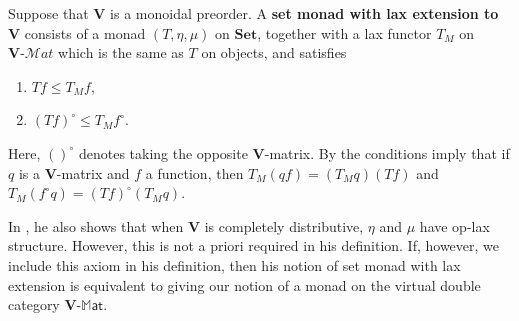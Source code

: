 \documentclass{tac}
\newcommand{\mb}[1]{{\mathbf{#1}}}
\newcommand{\mat}[1]{\mathbf{#1}\mbox{-}\mathcal{M}\mathit{at}}
\newcommand{\MAT}[1]{\mathbf{#1}\mbox{-}\mathbb{M}\mathsf{at}}
\numberwithin{equation}{section}
\begin{document}
\begin{definition}
  Suppose that $\mb{V}$ is a monoidal preorder.  A \textbf{set monad
    with lax extension to $\mb{V}$} consists of a monad $(T, \eta, \mu)$
  on $\mb{Set}$, together with a lax functor $T_M$ on $\mat{V}$ which is
  the same as $T$ on objects, and satisfies
	\begin{enumerate}
	\item $Tf \leq T_M f$,
	\item $(Tf)^{\circ} \leq T_M f^{\circ}$.
	\end{enumerate}
\end{definition}
Here, $()^{\circ}$ denotes taking the opposite $\mb{V}$-matrix.  By
\cite[p.~225]{SealCanonical} the conditions imply that if $q$ is a
$\mb{V}$-matrix and $f$ a function, then $T_M(qf) = (T_Mq)(Tf)$ and
$T_M(f^{\circ}q) = (Tf)^{\circ}(T_Mq)$.

In \cite[p.~203]{SealCanonical}, he also shows that when $\mb{V}$ is
completely distributive, $\eta$ and $\mu$ have op-lax structure.
However, this is not a priori required in his definition.  If, however,
we include this axiom in his definition, then his notion of set monad
with lax extension is equivalent to giving our notion of a monad on the
virtual double category $\MAT{V}$.
\end{document}
